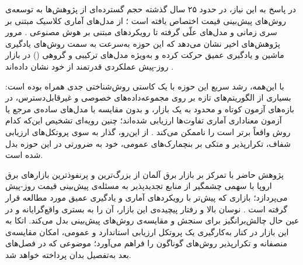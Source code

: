 در پاسخ به این نیاز، در حدود ۲۵ سال گذشته حجم گسترده‌ای از پژوهش‌ها به توسعه‌ی
روش‌های پیش‌بینی قیمت اختصاص یافته است \cite{jedrzejewski_electricity_2022}؛ از مدل‌های آماری کلاسیک مبتنی بر سری
زمانی و مدل‌های علّی گرفته تا رویکردهای مبتنی بر هوش مصنوعی
\cite{aggarwal_electricity_2009}. مرور پژوهش‌های اخیر نشان می‌دهد که این حوزه
به‌سرعت به سمت روش‌های یادگیری ماشین و یادگیری عمیق حرکت کرده و به‌ویژه مدل‌های
ترکیبی و گروهی () در بازار روز-پیش عملکردی قدرتمند از خود نشان
داده‌اند \cite{oconnor_review_2025, chai_forecasting_2024}.

با این‌همه، رشد سریع این حوزه با یک کاستی روش‌شناختی جدی همراه بوده است: بسیاری
از الگوریتم‌های تازه بر روی مجموعه‌داده‌های خصوصی و غیرقابل‌دسترس، در بازه‌های
آزمون کوتاه و محدود به یک بازار، و بدون مقایسه با مدل‌های ساده‌ی مرجع یا آزمون
معناداری آماری تفاوت‌ها ارزیابی شده‌اند؛ چنین رویه‌ای تشخیص این‌که کدام روش
واقعاً برتر است را ناممکن می‌کند \cite{lago_forecasting_2021}. از این‌رو، گذار
به سوی پروتکل‌های ارزیابی شفاف، تکرارپذیر و متکی بر بنچمارک‌های عمومی، خود به
ضرورتی در این حوزه بدل شده است.

پژوهش حاضر با تمرکز بر بازار برق آلمان  از بزرگ‌ترین و پرنفوذترین بازارهای برق
اروپا با سهمی چشمگیر از منابع تجدیدپذیر  به مسئله‌ی پیش‌بینی قیمت روز-پیش
می‌پردازد؛ بازاری که پیش‌تر با رویکردهای آماری و یادگیری عمیق مورد مطالعه قرار
گرفته است \cite{poggi_electricity_2023}. نوسان بالا و رفتار پیچیده‌ی این بازار،
آن را به بستری واقع‌گرایانه و در عین حال چالش‌برانگیز برای سنجش و مقایسه‌ی
روش‌های پیش‌بینی بدل می‌کند. اتکا به این بازار در کنار به‌کارگیری یک پروتکل
ارزیابی استاندارد و عمومی، امکان مقایسه‌ی منصفانه و تکرارپذیر روش‌های گوناگون را
فراهم می‌آورد؛ موضوعی که در فصل‌های بعد به‌تفصیل بدان پرداخته خواهد شد.

